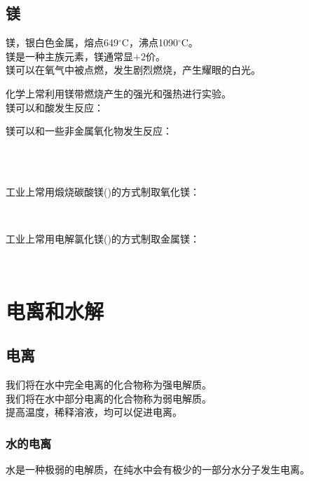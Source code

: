 \documentclass[UTF8]{ctexart}
\begin{document}
\subsection{镁}
    镁，银白色金属，熔点649$^\circ$C，沸点1090$^\circ$C。\\[3mm]
    镁是一种主族元素，镁通常显$+2$价。\\[5mm]
    镁可以在氧气中被点燃，发生剧烈燃烧，产生耀眼的白光。
    \begin{center}
    \end{center}
    化学上常利用镁带燃烧产生的强光和强热进行实验。\\[6mm]
    镁可以和酸发生反应：
    \begin{center}
    \end{center}
    \vspace{15pt}
    镁可以和一些非金属氧化物发生反应：
    \begin{center}
        \\[3mm]
        \\[3mm]
    \end{center}
    \vspace{15pt}
    工业上常用煅烧碳酸镁()的方式制取氧化镁：
    \begin{center}
        \\[3mm]
    \end{center}
    工业上常用电解氯化镁()的方式制取金属镁：
    \begin{center}
        \\[3mm]
    \end{center}

\newpage

\section{电离和水解}
    
\subsection{电离}
    我们将在水中完全电离的化合物称为强电解质。\\[3mm]
    我们将在水中部分电离的化合物称为弱电解质。\\[3mm]
    提高温度，稀释溶液，均可以促进电离。

\subsubsection{水的电离}
    水是一种极弱的电解质，在纯水中会有极少的一部分水分子发生电离。
    \begin{center}
    \end{center}
\end{document}
